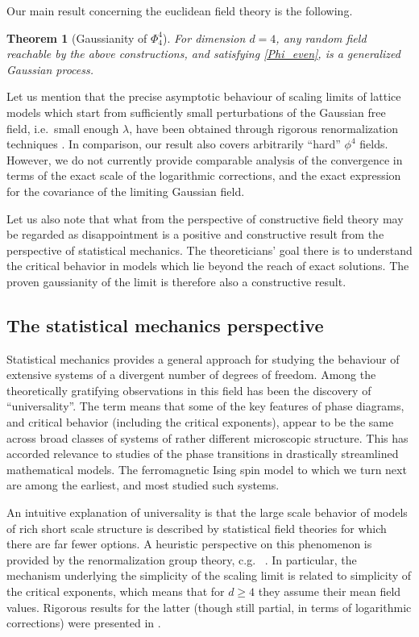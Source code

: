 \documentclass[a4paper,oneside,11pt]{article}
\newtheorem{theorem}{Theorem}[section]
\numberwithin{equation}{section}
\numberwithin{equation}{section}
\numberwithin{equation}{section}
\begin{document}
Our main result concerning the euclidean field theory is the following.   
   \begin{theorem}[Gaussianity of $\Phi^4_4$]\label{thm:gaussian phi4}
For  dimension $d=4$,  any random field reachable by the above constructions, and satisfying \eqref{Phi_even}, is a generalized Gaussian process. \end{theorem}

Let us mention that the precise asymptotic behaviour of scaling limits of lattice models which start from sufficiently small perturbations of the Gaussian free field, i.e.~small enough $\lambda$,  have been obtained through rigorous renormalization techniques   \cite{BauBrySla14,FMRS87,GawKup85,HarTas87}.  In comparison, our result also covers  arbitrarily ``hard'' $\phi^4$ fields.  However, we do not currently provide comparable analysis of the convergence in terms of the exact scale of the logarithmic corrections, and the exact expression for the covariance of the limiting Gaussian field.


Let us also note that what from the perspective of constructive field theory may be regarded as disappointment is a positive and constructive result  from the perspective of statistical mechanics.   The theoreticians' goal there is to understand the critical behavior in models which lie beyond the reach of exact solutions.   The proven gaussianity of the limit  is therefore also a constructive result.    


\subsection{The statistical mechanics perspective} 

Statistical mechanics provides a general approach for studying the behaviour of extensive systems of a divergent number of degrees of freedom.  Among the theoretically gratifying observations in this field  has been the discovery of ``universality''.  The term means that some of the key features of phase diagrams, and critical behavior (including the critical exponents),  appear to be the same across broad classes of systems of rather different microscopic structure.   This has accorded 
 relevance to studies of the phase transitions in drastically streamlined mathematical models. 
The  ferromagnetic Ising spin model 
 to which we turn next are among  the earliest, and most studied  such systems.  

An intuitive explanation of universality is that the large scale behavior of models of rich short scale structure  is described by statistical field theories for which there are far fewer  options.    A heuristic perspective on this phenomenon is provided by the renormalization group theory, c.g.  ~\cite{Wil71}.   In particular, the mechanism underlying the simplicity of the scaling limit is related to simplicity of the critical exponents, which means that for $d\geq 4$ they assume their mean field values. Rigorous results for the latter (though still partial, in terms of logarithmic corrections) were presented in \cite{Sok79, AizFer86}.  
\end{document}

